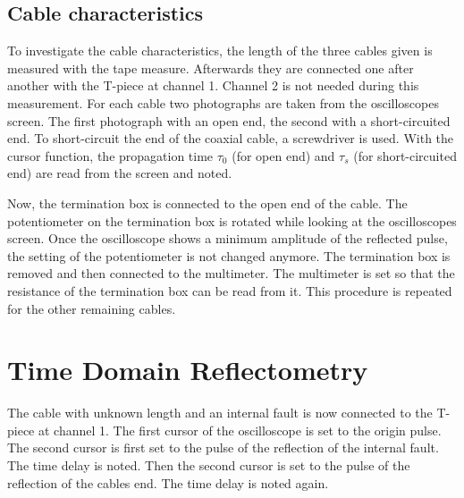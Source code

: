         \subsection{Cable characteristics}\label{subsec:exec:cable_char}
            To investigate the cable characteristics, the length of the three cables given is measured with the tape measure.
            Afterwards they are connected one after another with the T-piece at channel 1. Channel 2 is not needed during this
            measurement. For each cable two photographs are taken from the oscilloscopes screen. The first photograph with an open
            end, the second with a short-circuited end. To short-circuit the end of the coaxial cable, a screwdriver is used. With
            the cursor function, the propagation time \(\tau_0\) (for open end) and \(\tau_s\) (for short-circuited end) are read from
            the screen and noted.\par
            Now, the termination box is connected to the open end of the cable. The potentiometer on the termination box is rotated
            while looking at the oscilloscopes screen. Once the oscilloscope shows a minimum amplitude of the reflected pulse, the
            setting of the potentiometer is not changed anymore. The termination box is removed and then connected to the multimeter.
            The multimeter is set so that the resistance of the termination box can be read from it. This procedure is repeated for
            the other remaining cables.
    \section{Time Domain Reflectometry}\label{subsec:exec:TDR}
        The cable with unknown length and an internal fault is now connected to the T-piece at channel 1. The first cursor of the
        oscilloscope is set to the origin pulse. The second cursor is first set to the pulse of the reflection of the internal
        fault. The time delay is noted. Then the second cursor is set to the pulse of the reflection of the cables end. The time
        delay is noted again.